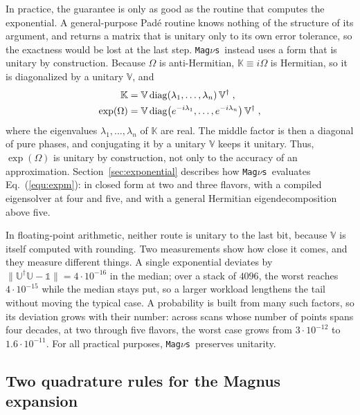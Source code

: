 \documentclass[final,5p,times,twocolumn,sort,compress]{elsarticle}
\makeatletter
\newcommand{\eq}{Eq.}
\DeclareRobustCommand{\_}{%
  \ifmmode\nfss@text{\textunderscore}\else\textunderscore\allowbreak\fi}
\newcommand{\equ}[1]{\eq~(\ref{equ:#1})}
\newcommand{\magnus}{{\tt Mag}\ensuremath{\nu}{\tt s}}
\makeatother
\begin{document}
In practice, the guarantee is only as good as the routine that computes the exponential. A general-purpose Pad\'e routine knows nothing of the structure of its argument, and returns a matrix that is unitary only to its own error tolerance, so the exactness would be lost at the last step. \magnus\ instead uses a form that is unitary by construction. Because $\Omega$ is anti-Hermitian, $\mathbb{K} \equiv i\Omega$ is Hermitian, so it is diagonalized by a unitary $\mathbb{V}$, and
\begin{align}
 \mathbb{K} &= \mathbb{V}\, {\rm diag}(\lambda_1, \ldots, \lambda_n)\, \mathbb{V}^\dagger \;, \nonumber \\
 \label{equ:expm}
 \exp(\Omega) &= \mathbb{V}\, {\rm diag}\!\left(e^{-i\lambda_1}, \ldots, e^{-i\lambda_n}\right) \mathbb{V}^\dagger \;,
\end{align}
where the eigenvalues $\lambda_1, \ldots, \lambda_n$ of $\mathbb{K}$ are real. The middle factor is then a diagonal of pure phases, and conjugating it by a unitary $\mathbb{V}$ keeps it unitary. Thus, $\exp(\Omega)$ is unitary by construction, not only to the accuracy of an approximation. Section~\ref{sec:exponential} describes how \magnus\ evaluates \equ{expm}: in closed form at two and three flavors, with a compiled eigensolver at four and five, and with a general Hermitian eigendecomposition above five.

In floating-point arithmetic, neither route is unitary to the last bit, because $\mathbb{V}$ is itself computed with rounding. Two measurements show how close it comes, and they measure different things. A single exponential deviates by $\lVert \mathbb{U}^\dagger \mathbb{U} - \mathbb{1}\rVert = 4 \cdot 10^{-16}$ in the median; over a stack of $4096$, the worst reaches $4 \cdot 10^{-15}$ while the median stays put, so a larger workload lengthens the tail without moving the typical case. A probability is built from many such factors, so its deviation grows with their number: across scans whose number of points spans four decades, at two through five flavors, the worst case grows from $3 \cdot 10^{-12}$ to $1.6 \cdot 10^{-11}$. For all practical purposes, \magnus\ preserves unitarity.


\subsection{Two quadrature rules for the Magnus expansion}
\label{sec:quadrature}
\end{document}
